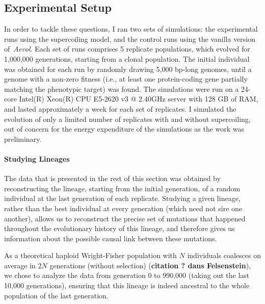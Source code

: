 \subsection{Experimental Setup}

In order to tackle these questions, I ran two sets of simulations: the experimental runs using the supercoiling model, and the control runs using the vanilla version of \emph{Aevol}.
Each set of runs comprises 5 replicate populations, which evolved for 1,000,000 generations, starting from a clonal population.
The initial individual was obtained for each run by randomly drawing 5,000 bp-long genomes, until a genome with a non-zero fitness (i.e., at least one protein-coding gene partially matching the phenotypic target) was found.
The simulations were run on a 24-core Intel(R) Xeon(R) CPU E5-2620 v3 @ 2.40GHz server with 128 GB of RAM, and lasted approximately a week for each set of replicates.
I simulated the evolution of only a limited number of replicates with and without supercoiling, out of concern for the energy expenditure of the simulations as the work was preliminary.


\paragraph{Studying Lineages}
The data that is presented in the rest of this section was obtained by reconstructing the lineage, starting from the initial generation, of a random individual at the last generation of each replicate.
Studying a given lineage, rather than the best individual at every generation (which need not sire one another), allows us to reconstruct the precise set of mutations that happened throughout the evolutionary history of this lineage, and therefore gives us information about the possible causal link between these mutations.

As a theoretical haploid Wright-Fisher population with $N$ individuals coalesces on average in $2N$ generations (without selection) (\textbf{citation ? dans Felsenstein}), we chose to analyze the data from generation 0 to 990,000 (taking out the last 10,000 generations), ensuring that this lineage is indeed ancestral to the whole population of the last generation.


